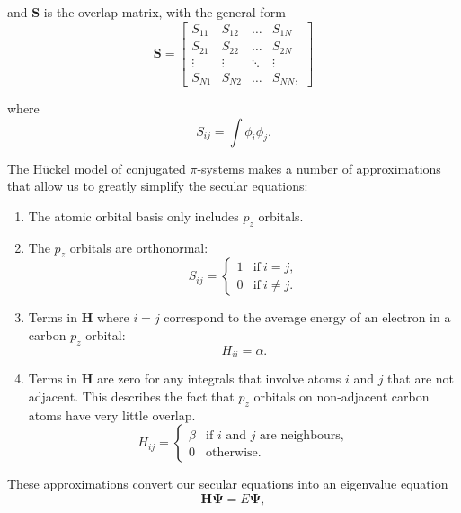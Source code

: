\documentclass[a4paper]{article}
\newcommand{\bvec}[1]{\boldsymbol{\mathbf{#1}}}
\begin{document}
and $\bvec{S}$ is the overlap matrix, with the general form
\begin{equation}
\bvec{S}=\begin{bmatrix}
S_{11} & S_{12} & \ldots & S_{1N} \\
S_{21} & S_{22} & \ldots & S_{2N} \\
\vdots & \vdots & \ddots & \vdots \\
S_{N1} & S_{N2} & \ldots & S_{NN},
\end{bmatrix}
\end{equation}

where
\begin{equation}
S_{ij} = \int \phi_i \phi_j.
\end{equation}

The H\"{u}ckel model of conjugated $\pi$-systems makes a number of approximations that allow us to greatly simplify the secular equations:
\begin{enumerate}
  \item The atomic orbital basis only includes $p_z$ orbitals.
  \item The $p_z$ orbitals are orthonormal:
    \begin{equation}
    S_{ij} = \begin{cases}
        1 & \text{if}\ i=j, \\
        0 & \text{if}\ i\neq j.
      \end{cases}
    \end{equation}
    \item Terms in $\bvec{H}$ where $i=j$ correspond to the average energy of an electron in a carbon $p_z$ orbital:
    \begin{equation}
    H_{ii} = \alpha.
    \end{equation}
    \item Terms in $\bvec{H}$ are zero for any integrals that involve atoms $i$ and $j$ that are not adjacent. This describes the fact that $p_z$ orbitals on non-adjacent carbon atoms have very little overlap.
    \begin{equation}
    H_{ij} = \begin{cases}
      \beta & \text{if }i\text{ and }j\text{ are neighbours},\\
      0 & \text{otherwise}.
      \end{cases}
    \end{equation}
\end{enumerate}
These approximations convert our secular equations into an eigenvalue equation
\begin{equation}
\bvec{H}\bvec{\Psi} = E\bvec{\Psi},
\end{equation}
\end{document}
